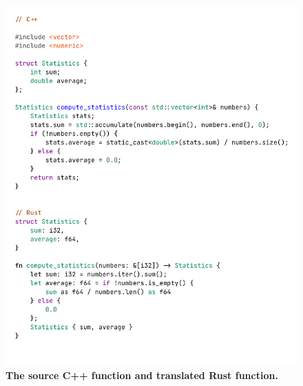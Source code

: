 \documentclass[twocolumn]{article}
\begin{document}
\begin{figure}[htbp]
    \centering
    \begin{minipage}{0.48\textwidth}
        \centering
        \includegraphics[width=\textwidth]{figures/source_cpp.png}
        \caption{\textbf{The source C++ function and translated Rust function.}}
        \label{fig:translate-overview1}
    \end{minipage}%
    \hfill
    \begin{minipage}{0.48\textwidth}
        \centering

\end{minipage}
\end{figure}
\end{document}

